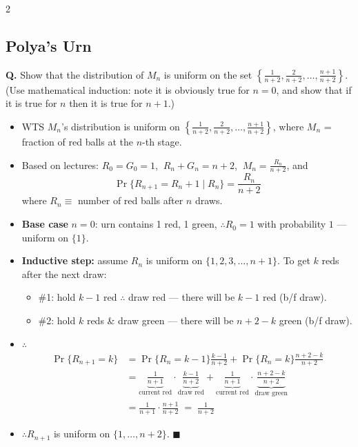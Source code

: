 \documentclass[8pt,letterpaper]{extarticle}
\begin{document}
\begin{multicols}{2}
\subsection{Polya's Urn}
\textbf{Q.} Show that the distribution of $M_n$ is uniform on the set $\left\{\frac{1}{n+2},\frac{2}{n+2},\dots,\frac{n+1}{n+2}\right\}$. (Use mathematical induction: note it is obviously true for $n=0$, and show that if it is true for $n$ then it is true for $n+1$.)
\begin{itemize}
  \item WTS $M_n$'s distribution is uniform on $\left\{\frac{1}{n+2},\frac{2}{n+2},\dots,\frac{n+1}{n+2}\right\}$, where $M_n$ = fraction of red balls at the $n$-th stage.
  \item Based on lectures: $R_0=G_0=1$, $\ R_n+G_n=n+2$, $\ M_n=\frac{R_n}{n+2}$, and
    \[ \Pr\{R_{n+1}=R_n+1\mid R_n\}=\frac{R_n}{n+2} \]
    where $R_n \equiv$ number of red balls after $n$ draws.
  \item \textbf{Base case} $n=0$: urn contains 1 red, 1 green, $\therefore R_0=1$ with probability $1$ --- uniform on $\{1\}$.
  \item \textbf{Inductive step:} assume $R_n$ is uniform on $\{1,2,3,\dots,n+1\}$. To get $k$ reds after the next draw:
    \begin{itemize}
      \item \#1: hold $k-1$ red $\therefore$ draw red --- there will be $k-1$ red (b/f draw).
      \item \#2: hold $k$ reds \& draw green --- there will be $n+2-k$ green (b/f draw).
    \end{itemize}
  \item $\therefore$
    \[ \begin{aligned}
      \Pr\{R_{n+1}=k\} &= \Pr\{R_n=k-1\}\tfrac{k-1}{n+2}+\Pr\{R_n=k\}\tfrac{n+2-k}{n+2} \\
      &= \underbrace{\tfrac{1}{n+1}}_{\text{current red}}\cdot\underbrace{\tfrac{k-1}{n+2}}_{\text{draw red}}
       + \underbrace{\tfrac{1}{n+1}}_{\text{current red}}\cdot\underbrace{\tfrac{n+2-k}{n+2}}_{\text{draw green}} \\
      &= \tfrac{1}{n+1}\cdot\tfrac{n+1}{n+2} \;=\; \tfrac{1}{n+2}
    \end{aligned} \]
  \item $\therefore R_{n+1}$ is uniform on $\{1,\dots,n+2\}$. $\blacksquare$
\end{itemize}



\end{multicols}
\end{document}
